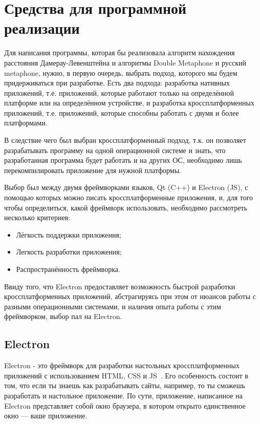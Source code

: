 \section{Средства для программной реализации}

Для написания программы, которая бы  реализовала алгоритм нахождения расстояния Дамерау-Левенштейна и алгоритмы Double Metaphone и русский metaphone, нужно, в первую очередь, выбрать подход, которого мы будем придерживаться при разработке. Есть два подхода: разработка нативных приложений, т.е. приложений, которые работают только на определённой платформе или на определённом устройстве, и разработка кроссплатформенных приложений, т.е. приложений, которые способны работать с двумя и более платформами.

В следствие чего был выбран кроссплатформенный подход, т.к. он позволяет разрабатывать программу на одной операционной системе и знать, что разработанная программа будет работать и на других ОС, необходимо лишь перекомпилировать приложение для нужной платформы.

Выбор был между двумя фреймворками языков, Qt (C++) и Electron (JS), с помощью которых можно писать кроссплатформенные приложения, и, для того чтобы определиться, какой фреймворк использовать, необходимо рассмотреть несколько критериев:

\begin{itemize}
  \item Лёгкость поддержки приложения;
  \item Легкость разработки приложения;
  \item Распространённость фреймворка.
\end{itemize}

Ввиду того, что Electron предоставляет возможность быстрой разработки кроссплатформенных приложений, абстрагируясь при этом от нюансов работы с разными операционными системами, и наличия опыта работы с этим фреймворком, выбор пал на Electron.

\subsection{Electron}

Electron - это фреймворк для разработки настольных кроссплатформенных приложений с использованием HTML, CSS и JS~\cite{electron}. Его особенность состоит в том, что если ты знаешь как разрабатывать сайты, например, то ты сможешь разработать и настольное приложение. По сути, приложение, написанное на Electron представляет собой окно браузера, в котором открыто единственное окно --- ваше приложение.

